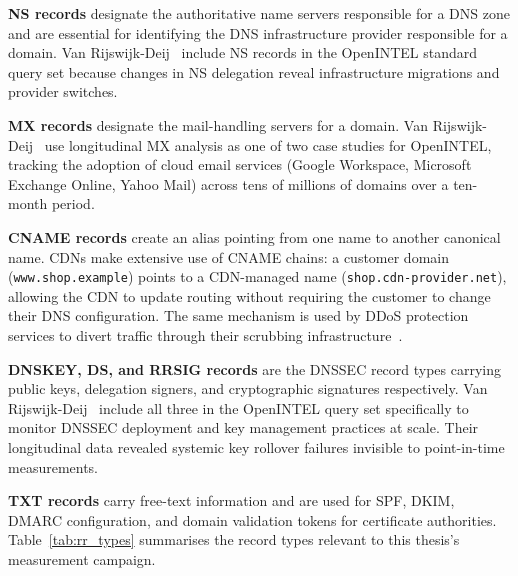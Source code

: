 \textbf{\ac{NS} records} designate the authoritative name servers responsible for a \ac{DNS} zone and are essential for identifying the \ac{DNS} infrastructure provider responsible for a domain. Van Rijswijk-Deij~\cite{vanRijswijk2016} include \ac{NS} records in the OpenINTEL standard query set because changes in \ac{NS} delegation reveal infrastructure migrations and provider switches.

\textbf{\ac{MX} records} designate the mail-handling servers for a domain. Van Rijswijk-Deij~\cite{vanRijswijk2016} use longitudinal \ac{MX} analysis as one of two case studies for OpenINTEL, tracking the adoption of cloud email services (Google Workspace, Microsoft Exchange Online, Yahoo Mail) across tens of millions of domains over a ten-month period.

\textbf{\ac{CNAME} records} create an alias pointing from one name to another canonical name. \ac{CDN}s make extensive use of \ac{CNAME} chains: a customer domain (\texttt{www.shop.example}) points to a \ac{CDN}-managed name (\texttt{shop.cdn-provider.net}), allowing the \ac{CDN} to update routing without requiring the customer to change their \ac{DNS} configuration. The same mechanism is used by \ac{DDoS} protection services to divert traffic through their scrubbing infrastructure~\cite{Jonker2016}.


\textbf{DNSKEY, DS, and RRSIG records} are the \ac{DNSSEC} record types carrying public keys, delegation signers, and cryptographic signatures respectively. Van Rijswijk-Deij~\cite{vanRijswijk2016} include all three in the OpenINTEL query set specifically to monitor \ac{DNSSEC} deployment and key management practices at scale. Their longitudinal data revealed systemic key rollover failures invisible to point-in-time measurements.

\textbf{\ac{TXT} records} carry free-text information and are used for \ac{SPF}, \ac{DKIM}, \ac{DMARC} configuration, and domain validation tokens for certificate authorities. Table~\ref{tab:rr_types} summarises the record types relevant to this thesis's measurement campaign.

